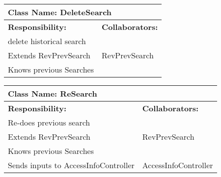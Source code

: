 \documentclass[]{article}
\begin{document}
\begin{table}[ht]
		\centering
		\begin{tabular}{|p{5cm}|p{5cm}|}
			\hline 
			\multicolumn{2}{|l|}{\textbf{Class Name: DeleteSearch}} \\
			\hline
			\textbf{Responsibility:} & \textbf{Collaborators:} \\
			\hline
			delete historical search  & \\
			\hline
			Extends RevPrevSearch & RevPrevSearch\\
			\hline
			Knows previous Searches & \\
			\hline
		\end{tabular}
	\end{table}	


	
\begin{table}[ht]
		\centering
		\begin{tabular}{|p{5cm}|p{5cm}|}
			\hline 
			\multicolumn{2}{|l|}{\textbf{Class Name: ReSearch}} \\
			\hline
			\textbf{Responsibility:} & \textbf{Collaborators:} \\
			\hline
			Re-does previous search & \\
			\hline
			Extends RevPrevSearch & RevPrevSearch\\
			\hline
			Knows previous Searches & \\
			\hline
			Sends inputs to AccessInfoController & AccessInfoController\\
			\hline
		\end{tabular}
	\end{table}	



\newpage
\clearpage
\appendix
\end{document}
